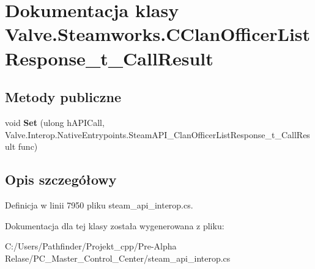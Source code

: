 \hypertarget{class_valve_1_1_steamworks_1_1_c_clan_officer_list_response__t___call_result}{}\section{Dokumentacja klasy Valve.\+Steamworks.\+C\+Clan\+Officer\+List\+Response\+\_\+t\+\_\+\+Call\+Result}
\label{class_valve_1_1_steamworks_1_1_c_clan_officer_list_response__t___call_result}
\subsection*{Metody publiczne}
\begin{DoxyCompactItemize}
\item 
\mbox{\label{class_valve_1_1_steamworks_1_1_c_clan_officer_list_response__t___call_result_a4e328a57b54b856034dfec65ecf69a70}} 
void {\bfseries Set} (ulong h\+A\+P\+I\+Call, Valve.\+Interop.\+Native\+Entrypoints.\+Steam\+A\+P\+I\+\_\+\+Clan\+Officer\+List\+Response\+\_\+t\+\_\+\+Call\+Result func)
\end{DoxyCompactItemize}


\subsection{Opis szczegółowy}


Definicja w linii 7950 pliku steam\+\_\+api\+\_\+interop.\+cs.



Dokumentacja dla tej klasy została wygenerowana z pliku\+:\begin{DoxyCompactItemize}
\item 
C\+:/\+Users/\+Pathfinder/\+Projekt\+\_\+cpp/\+Pre-\/\+Alpha Relase/\+P\+C\+\_\+\+Master\+\_\+\+Control\+\_\+\+Center/steam\+\_\+api\+\_\+interop.\+cs\end{DoxyCompactItemize}

